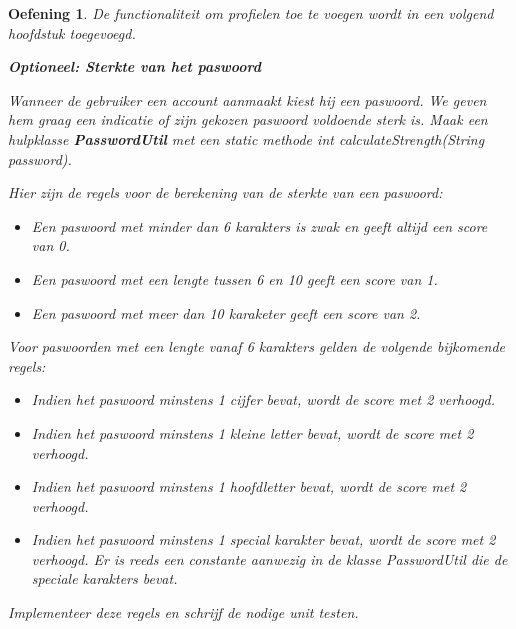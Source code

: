 \documentclass{tstextbook}
\newtheorem{envoefening}{Oefening}[chapter]
\newenvironment{oefening}
               {\begin{boxexercise}\begin{envoefening}}
               {\end{envoefening}\end{boxexercise}}
\begin{document}
\begin{oefening}
De functionaliteit om profielen toe te voegen wordt in een volgend hoofdstuk toegevoegd.

\textbf{Optioneel: Sterkte van het paswoord}

Wanneer de gebruiker een account aanmaakt kiest hij een paswoord. We geven hem graag een indicatie of zijn gekozen paswoord voldoende sterk is.
Maak een hulpklasse \textbf{PasswordUtil}  met een static methode \textit{int calculateStrength(String password)}. 

Hier zijn de regels voor de berekening van de sterkte van een paswoord:
\begin{itemize}
\item Een paswoord met minder dan 6 karakters is zwak en geeft altijd een score van 0.
\item Een paswoord met een lengte tussen 6 en 10 geeft een score van 1.
\item Een paswoord met meer dan 10 karaketer geeft een score van 2.
\end{itemize}
Voor paswoorden met een lengte vanaf 6 karakters gelden de volgende bijkomende regels:
\begin{itemize}
\item Indien het paswoord minstens 1 cijfer bevat, wordt de score met 2 verhoogd.
\item Indien het paswoord minstens 1 kleine letter bevat, wordt de score met 2 verhoogd.
\item Indien het paswoord minstens 1 hoofdletter bevat, wordt de score met 2 verhoogd.
\item Indien het paswoord minstens 1 special karakter bevat, wordt de score met 2 verhoogd. Er is reeds een constante aanwezig in de klasse PasswordUtil die de speciale karakters bevat.
\end{itemize}
Implementeer deze regels en schrijf de nodige unit testen.
\end{oefening}
\end{document}
